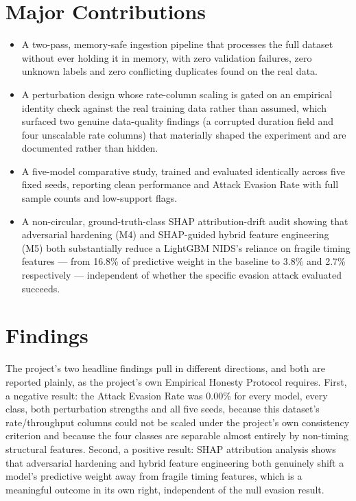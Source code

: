 \documentclass[12pt,a4paper]{report}
\begin{document}
\section{Major Contributions}
\begin{itemize}\setlength\itemsep{2pt}\item A two-pass, memory-safe ingestion pipeline that processes the full dataset without ever holding it in memory, with zero validation failures, zero unknown labels and zero conflicting duplicates found on the real data.\end{itemize}
\begin{itemize}\setlength\itemsep{2pt}\item A perturbation design whose rate-column scaling is gated on an empirical identity check against the real training data rather than assumed, which surfaced two genuine data-quality findings (a corrupted duration field and four unscalable rate columns) that materially shaped the experiment and are documented rather than hidden.\end{itemize}
\begin{itemize}\setlength\itemsep{2pt}\item A five-model comparative study, trained and evaluated identically across five fixed seeds, reporting clean performance and Attack Evasion Rate with full sample counts and low-support flags.\end{itemize}
\begin{itemize}\setlength\itemsep{2pt}\item A non-circular, ground-truth-class SHAP attribution-drift audit showing that adversarial hardening (M4) and SHAP-guided hybrid feature engineering (M5) both substantially reduce a LightGBM NIDS's reliance on fragile timing features --- from 16.8\% of predictive weight in the baseline to 3.8\% and 2.7\% respectively --- independent of whether the specific evasion attack evaluated succeeds.\end{itemize}
\section{Findings}
The project's two headline findings pull in different directions, and both are reported plainly, as the project's own Empirical Honesty Protocol requires. First, a negative result: the Attack Evasion Rate was 0.00\% for every model, every class, both perturbation strengths and all five seeds, because this dataset's rate/throughput columns could not be scaled under the project's own consistency criterion and because the four classes are separable almost entirely by non-timing structural features. Second, a positive result: SHAP attribution analysis shows that adversarial hardening and hybrid feature engineering both genuinely shift a model's predictive weight away from fragile timing features, which is a meaningful outcome in its own right, independent of the null evasion result.
\end{document}
